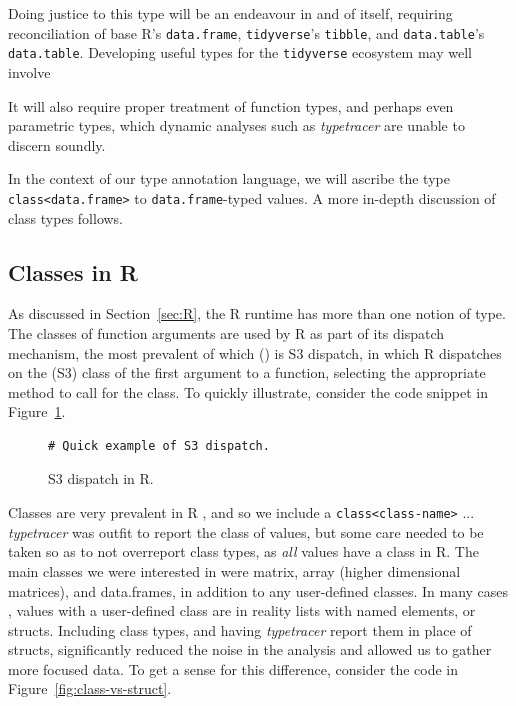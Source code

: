 \documentclass[acmsmall,review,anonymous]{acmart}\settopmatter{printfolios=true,printccs=false,printacmref=false}
\newcommand{\code}[1]{{\lstinline[style=Rin]!#1!}\xspace}
\newcommand{\typetracer}{\emph{typetracer}\xspace} %
\begin{document}
Doing justice to this type will be an endeavour in and of itself, requiring
reconciliation of base R's \code{data.frame}, \code{tidyverse}'s
\code{tibble}, and \code{data.table}'s \code{data.table}.  Developing useful
types for the \code{tidyverse} ecosystem may well involve

It will also require proper treatment of function types, and perhaps even
parametric types, which dynamic analyses such as \typetracer are unable to
discern soundly.

In the context of our type annotation language, we will ascribe the type \code{class<data.frame>} to \code{data.frame}-typed values.
A more in-depth discussion of class types follows.

%
%
%
%
\subsection{Classes in R}
\label{subsec:classes}

As discussed in Section~\ref{sec:R}, the R runtime has more than one notion
of type.  The classes of function arguments are used by R as part of its
dispatch mechanism, the most prevalent of which () is S3 dispatch, in which R dispatches on the (S3) class of the
first argument to a function, selecting the appropriate method to call for
the class.  To quickly illustrate, consider the code snippet in
Figure~\ref{fig:dispatch-ex}.

\begin{figure}[htbp]
\begin{center}

\begin{lstlisting}
# Quick example of S3 dispatch.
\end{lstlisting}

\caption{S3 dispatch in R.}
\label{fig:dispatch-ex}
\end{center}
\end{figure}

Classes are very prevalent in R , and so we include a
\code{class<class-name>} ...  \typetracer was outfit to report the
class of values, but some care needed to be taken so as to not overreport
class types, as {\it all} values have a class in R.  The main classes we
were interested in were matrix, array (higher dimensional matrices), and
data.frames, in addition to any user-defined classes.  In many cases
, values with a user-defined class are in reality lists with
named elements, or structs.  Including class types, and having \typetracer
report them in place of structs, significantly reduced the noise in the
analysis and allowed us to gather more focused data.  To get a sense for
this difference, consider the code in Figure~\ref{fig:class-vs-struct}.
\end{document}
